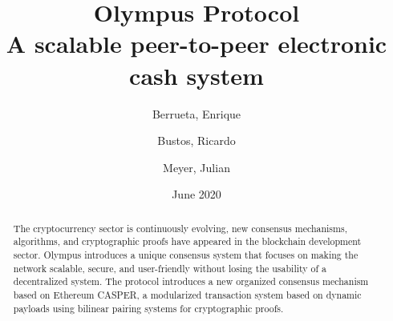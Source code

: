 \documentclass{article}
\title{%
  Olympus Protocol \\
  \large A scalable peer-to-peer electronic cash system}
\author{
  Berrueta, Enrique\\
  \and
  Bustos, Ricardo\\
  \and
  Meyer, Julian
}
\date{June 2020}
\begin{document}
	\maketitle
	\begin{abstract}
		The cryptocurrency sector is continuously evolving, new consensus mechanisms, algorithms, and cryptographic proofs have appeared in the blockchain development sector. Olympus introduces a unique consensus system that focuses on making the network scalable, secure, and user-friendly without losing the usability of a decentralized system. The protocol introduces a new organized consensus mechanism based on Ethereum CASPER, a modularized transaction system based on dynamic payloads using bilinear pairing systems for cryptographic proofs.
	\end{abstract}
	
	\newpage
	\tableofcontents		
	
\end{document}
